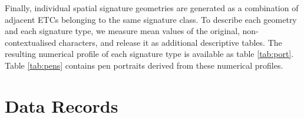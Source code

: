 \documentclass[fleqn,10pt]{wlscirep}
\begin{document}
Finally, individual spatial signature geometries are generated as a combination of
adjacent ETCs belonging to the same signature class. To describe each geometry and
each signature type, we measure mean values of the original, non-contextualised
characters, and release it as additional descriptive tables. The resulting numerical
profile of each signature type is available as table \ref{tab:port}. Table \ref{tab:pens} contains pen portraits
derived from these numerical profiles.




\section*{Data Records}



\end{document}
